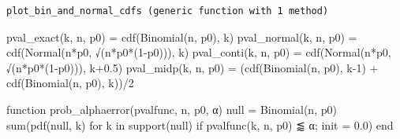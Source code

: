 \documentclass[
  letterpaper,
  DIV=11,
  numbers=noendperiod]{scrartcl}
\newenvironment{Shaded}{\begin{snugshade}}{\end{snugshade}}
\newcommand{\ControlFlowTok}[1]{\textcolor[rgb]{0.00,0.23,0.31}{#1}}
\newcommand{\FloatTok}[1]{\textcolor[rgb]{0.68,0.00,0.00}{#1}}
\newcommand{\FunctionTok}[1]{\textcolor[rgb]{0.28,0.35,0.67}{#1}}
\newcommand{\KeywordTok}[1]{\textcolor[rgb]{0.00,0.23,0.31}{#1}}
\newcommand{\NormalTok}[1]{\textcolor[rgb]{0.00,0.23,0.31}{#1}}
\newcommand{\OperatorTok}[1]{\textcolor[rgb]{0.37,0.37,0.37}{#1}}
\begin{document}
\begin{verbatim}
plot_bin_and_normal_cdfs (generic function with 1 method)
\end{verbatim}

\begin{Shaded}
\begin{Highlighting}[]
\FunctionTok{pval\_exact}\NormalTok{(k, n, p0) }\OperatorTok{=} \FunctionTok{cdf}\NormalTok{(}\FunctionTok{Binomial}\NormalTok{(n, p0), k)}
\FunctionTok{pval\_normal}\NormalTok{(k, n, p0) }\OperatorTok{=} \FunctionTok{cdf}\NormalTok{(}\FunctionTok{Normal}\NormalTok{(n}\OperatorTok{*}\NormalTok{p0, }\FunctionTok{√}\NormalTok{(}\FunctionTok{n*p0*}\NormalTok{(}\FloatTok{1}\OperatorTok{{-}}\NormalTok{p0))), k)}
\FunctionTok{pval\_conti}\NormalTok{(k, n, p0) }\OperatorTok{=} \FunctionTok{cdf}\NormalTok{(}\FunctionTok{Normal}\NormalTok{(n}\OperatorTok{*}\NormalTok{p0, }\FunctionTok{√}\NormalTok{(}\FunctionTok{n*p0*}\NormalTok{(}\FloatTok{1}\OperatorTok{{-}}\NormalTok{p0))), k}\OperatorTok{+}\FloatTok{0.5}\NormalTok{)}
\FunctionTok{pval\_midp}\NormalTok{(k, n, p0) }\OperatorTok{=}\NormalTok{ (}\FunctionTok{cdf}\NormalTok{(}\FunctionTok{Binomial}\NormalTok{(n, p0), k}\OperatorTok{{-}}\FloatTok{1}\NormalTok{) }\OperatorTok{+} \FunctionTok{cdf}\NormalTok{(}\FunctionTok{Binomial}\NormalTok{(n, p0), k))}\OperatorTok{/}\FloatTok{2}

\KeywordTok{function} \FunctionTok{prob\_alphaerror}\NormalTok{(pvalfunc, n, p0, α)}
\NormalTok{    null }\OperatorTok{=} \FunctionTok{Binomial}\NormalTok{(n, p0)}
    \FunctionTok{sum}\NormalTok{(}\FunctionTok{pdf}\NormalTok{(null, k) }\ControlFlowTok{for}\NormalTok{ k }\KeywordTok{in} \FunctionTok{support}\NormalTok{(null)}
            \ControlFlowTok{if} \FunctionTok{pvalfunc}\NormalTok{(k, n, p0) }\OperatorTok{⪅}\NormalTok{ α; init }\OperatorTok{=} \FloatTok{0.0}\NormalTok{)}
\ControlFlowTok{end}


\end{Highlighting}
\end{Shaded}
\end{document}
